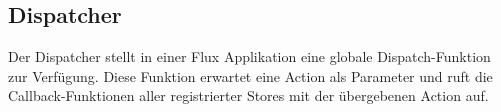 \subsection{Dispatcher}
\label{ssec:gf_dispatcher}

Der Dispatcher stellt in einer Flux Applikation eine globale Dispatch-Funktion
zur Verfügung.  Diese Funktion erwartet eine Action als Parameter und ruft die
Callback-Funktionen aller registrierter Stores mit der übergebenen Action auf.
